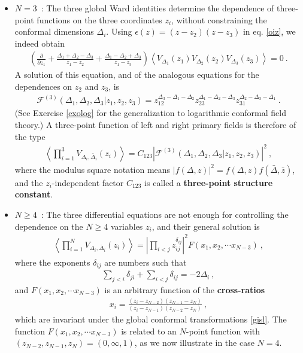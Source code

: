 \documentclass[12pt, a4paper, notitlepage, twoside]{report}
\numberwithin{equation}{section}
\theoremstyle{break}
\begin{document}
\begin{itemize}
\item $\boxed{N=3}$\ : The three global Ward identities determine the dependence of three-point functions on the three coordinates $z_i$, without constraining the conformal dimensions $\Delta_i$. Using $\epsilon(z)= (z-z_2)(z-z_3)$ in eq. \eqref{oiz}, we indeed obtain
\begin{align}
  \left(  \frac{\partial}{\partial z_1} + \frac{\Delta_1+\Delta_2-\Delta_3}{z_1-z_2} +\frac{\Delta_1-\Delta_2+\Delta_3}{z_1-z_3} \right) \left\langle V_{\Delta_1}(z_1)V_{\Delta_2}(z_2)V_{\Delta_3}(z_3)\right\rangle= 0\ .
\end{align}
A solution of this equation, and of the analogous equations for the dependences on $z_2$ and $z_3$, is 
\begin{align}
 \boxed{\mathcal{F}^{(3)}(\Delta_1,\Delta_2,\Delta_3|z_1,z_2,z_3) = z_{12}^{\Delta_3-\Delta_1-\Delta_2} z_{23}^{\Delta_1-\Delta_2-\Delta_3} z_{31}^{\Delta_2-\Delta_3-\Delta_1}}\ .
\label{fzzz}
\end{align}
(See Exercise \ref{exolog} for the generalization to logarithmic conformal field theory.)
A three-point function of left and right primary fields is therefore of the type
\begin{align}
 \left\langle \prod_{i=1}^3 V_{\Delta_i,\bar{\Delta}_i}(z_i) \right\rangle = C_{123}
 \left|\mathcal{F}^{(3)}(\Delta_1,\Delta_2,\Delta_3|z_1,z_2,z_3)\right|^2\ ,
\label{cff}
\end{align}
where the modulus square notation means $|f(\Delta,z)|^2 = f(\Delta,z)f(\bar{\Delta},\bar{z})$, and the $z_i$-independent factor
$C_{123}$ is called a \textbf{\boldmath three-point structure constant}.

\item $\boxed{N\geq 4}$\ : The three differential equations are not enough for controlling the dependence on the $N\geq 4$ variables $z_i$, and their general solution is 
\begin{align}
 \left\langle\prod_{i=1}^N V_{\Delta_i,\bar\Delta_i}(z_i)\right\rangle = \left|\prod_{i<j} z_{ij}^{\delta_{ij}}\right|^2 F(x_1,x_2,\cdots x_{N-3}) \ ,
\label{xfxn}
\end{align}
where the exponents $\delta_{ij}$ are numbers such that 
\begin{align}
 \sum_{j< i} \delta_{ji} +\sum_{i<j}\delta_{ij} = -2\Delta_i\ ,
 \label{sdd}
\end{align}
and $F(x_1,x_2,\cdots x_{N-3})$ is an arbitrary function of the \textbf{\boldmath cross-ratios}
\begin{align}
 x_i = \frac{(z_i-z_{N-2})(z_{N-1}-z_N)}{(z_i-z_{N-1})(z_{N-2}-z_N)}\ ,
\end{align}
which are invariant under the global conformal transformations \eqref{gisl}.
The function $F(x_1,x_2,\cdots x_{N-3})$ is related to an $N$-point function with $(z_{N-2},z_{N-1},z_N)=(0,\infty,1)$, as we now illustrate in the case $N=4$.


\end{itemize}
\end{document}
